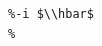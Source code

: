 \documentclass[border=10pt]{standalone}
\begin{document}
\begin{lstlisting}
%-i $\\hbar$ 
%
\end{lstlisting}
\end{document}
